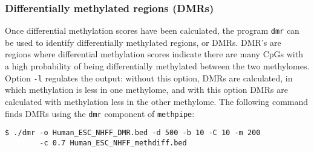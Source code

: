 \documentclass[10pt]{article}
\newcommand{\meth}{\texttt{methpipe}}
\newcommand{\prog}[1]{\texttt{#1}}
\newcommand{\op}[1]{\texttt{#1}}
\begin{document}


\subsubsection{Differentially methylated regions (DMRs)}
\label{sec:dmr}

Once differential methylation scores have been calculated, the program
\prog{dmr} can be used to identify differentially methylated
regions, or DMRs. DMR's are regions where differential methylation
scores indicate there are many CpGs with a high probability of being
differentially methylated between the two methylomes.  Option
\op{-l} regulates the output: without this option, DMRs are
calculated, in which methylation is less in one methylome, and with
this option DMRs are calculated with methylation less in the other
methylome. The following command finds DMRs using the \prog{dmr}
component of \meth{}:
\begin{verbatim}
$ ./dmr -o Human_ESC_NHFF_DMR.bed -d 500 -b 10 -C 10 -m 200
        -c 0.7 Human_ESC_NHFF_methdiff.bed
\end{verbatim}

\end{document}
